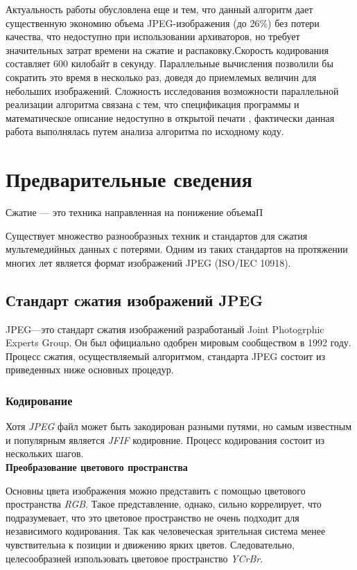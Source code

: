 \documentclass{matmex-diploma-custom}
\begin{document}
Актуальность работы обусловлена еще и тем, что данный алгоритм дает существенную экономию объема JPEG-изображения (до 26\%) без потери качества, что недоступно при использовании архиваторов, но требует значительных затрат времени на сжатие и распаковку.Скорость кодирования составляет 600 килобайт в секунду. Параллельные вычисления позволили бы сократить это время в несколько раз, доведя до приемлемых величин для небольших изображений. Сложность исследования возможности параллельной реализации алгоритма связана с тем, что спецификация программы и математическое описание недоступно в открытой печати , фактически данная работа выполнялась путем анализа алгоритма по исходному коду.

\section{Предварительные сведения}
Сжатие --- это техника направленная на понижение объемаП

Существует множество разнообразных  техник и стандартов для сжатия мультемедийных данных с потерями.
 Одним из таких стандартов на протяжении многих лет является формат изображений JPEG (ISO/IEC 10918).

\subsection{Стандарт сжатия изображений JPEG}
JPEG---это стандарт сжатия изображений разработаный Joint Photogrphic Experts Group. Он был официально одобрен мировым сообществом в 1992 году.%
  Процесс сжатия, осуществляемый алгоритмом, стандарта JPEG состоит из приведенных ниже основных процедур.

\subsubsection{Кодирование}
Хотя \emph{JPEG} файл может быть закодирован разными путями, но самым известным и популярным является \emph{JFIF} кодировние.
Процесс кодирования состоит из нескольких шагов.\\

\textbf{Преобразование цветового пространства} \newline

Основны цвета изображения можно  представить с помощью цветового пространства \emph{RGB}. Такое представление, однако,
сильно коррелирует, что подразумевает, что это цветовое пространство не очень подходит для независимого кодирования. Так как человеческая зрительная система менее чувствительна к позиции и движению ярких  цветов. Следовательно, целесообразней изпользовать цветовое пространство \emph{YCrBr}.\\
\end{document}
